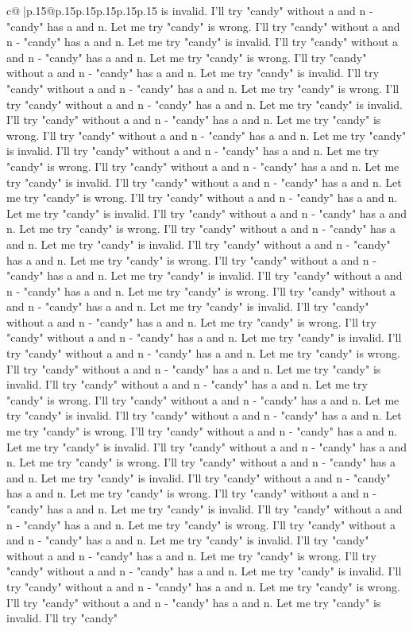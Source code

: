 \documentclass{article}
\begin{document}
{\begin{supertabular}{c@{$\;$}|p{.15\linewidth}@{}p{.15\linewidth}p{.15\linewidth}p{.15\linewidth}p{.15\linewidth}p{.15\linewidth}}
{{{is invalid. I'll try "candy" without a and n {-} "candy" has a and n. Let me try "candy" is wrong. I'll try "candy" without a and n {-} "candy" has a and n. Let me try "candy" is invalid. I'll try "candy" without a and n {-} "candy" has a and n. Let me try "candy" is wrong. I'll try "candy" without a and n {-} "candy" has a and n. Let me try "candy" is invalid. I'll try "candy" without a and n {-} "candy" has a and n. Let me try "candy" is wrong. I'll try "candy" without a and n {-} "candy" has a and n. Let me try "candy" is invalid. I'll try "candy" without a and n {-} "candy" has a and n. Let me try "candy" is wrong. I'll try "candy" without a and n {-} "candy" has a and n. Let me try "candy" is invalid. I'll try "candy" without a and n {-} "candy" has a and n. Let me try "candy" is wrong. I'll try "candy" without a and n {-} "candy" has a and n. Let me try "candy" is invalid. I'll try "candy" without a and n {-} "candy" has a and n. Let me try "candy" is wrong. I'll try "candy" without a and n {-} "candy" has a and n. Let me try "candy" is invalid. I'll try "candy" without a and n {-} "candy" has a and n. Let me try "candy" is wrong. I'll try "candy" without a and n {-} "candy" has a and n. Let me try "candy" is invalid. I'll try "candy" without a and n {-} "candy" has a and n. Let me try "candy" is wrong. I'll try "candy" without a and n {-} "candy" has a and n. Let me try "candy" is invalid. I'll try "candy" without a and n {-} "candy" has a and n. Let me try "candy" is wrong. I'll try "candy" without a and n {-} "candy" has a and n. Let me try "candy" is invalid. I'll try "candy" without a and n {-} "candy" has a and n. Let me try "candy" is wrong. I'll try "candy" without a and n {-} "candy" has a and n. Let me try "candy" is invalid. I'll try "candy" without a and n {-} "candy" has a and n. Let me try "candy" is wrong. I'll try "candy" without a and n {-} "candy" has a and n. Let me try "candy" is invalid. I'll try "candy" without a and n {-} "candy" has a and n. Let me try "candy" is wrong. I'll try "candy" without a and n {-} "candy" has a and n. Let me try "candy" is invalid. I'll try "candy" without a and n {-} "candy" has a and n. Let me try "candy" is wrong. I'll try "candy" without a and n {-} "candy" has a and n. Let me try "candy" is invalid. I'll try "candy" without a and n {-} "candy" has a and n. Let me try "candy" is wrong. I'll try "candy" without a and n {-} "candy" has a and n. Let me try "candy" is invalid. I'll try "candy" without a and n {-} "candy" has a and n. Let me try "candy" is wrong. I'll try "candy" without a and n {-} "candy" has a and n. Let me try "candy" is invalid. I'll try "candy" without a and n {-} "candy" has a and n. Let me try "candy" is wrong. I'll try "candy" without a and n {-} "candy" has a and n. Let me try "candy" is invalid. I'll try "candy" without a and n {-} "candy" has a and n. Let me try "candy" is wrong. I'll try "candy" without a and n {-} "candy" has a and n. Let me try "candy" is invalid. I'll try "candy" without a and n {-} "candy" has a and n. Let me try "candy" is wrong. I'll try "candy" without a and n {-} "candy" has a and n. Let me try "candy" is invalid. I'll try "candy" }}}
\end{supertabular}}
\end{document}
